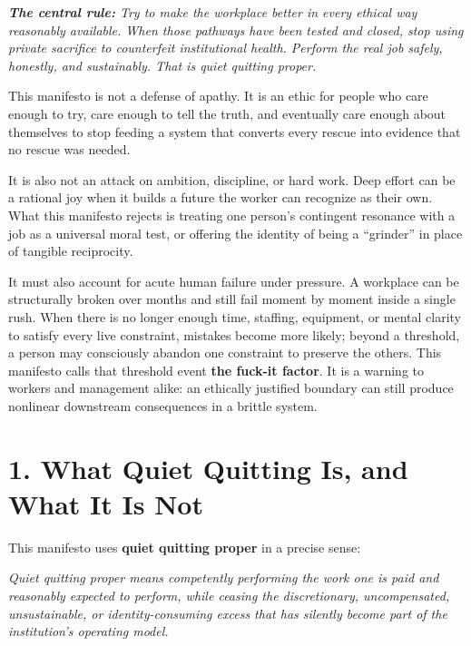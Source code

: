 \documentclass[11pt,oneside]{article}
\renewenvironment{quote}
  {\begin{tcolorbox}[
      enhanced,
      breakable,
      colback=ManifestLight,
      colframe=ManifestRule,
      boxrule=0pt,
      leftrule=3pt,
      arc=0pt,
      outer arc=0pt,
      left=10pt,right=10pt,top=8pt,bottom=8pt,
      before skip=0.8em,after skip=0.8em
    ]\itshape}
  {\end{tcolorbox}}
\begin{document}
\begin{quote}
\textbf{The central rule:} Try to make the workplace better in every
ethical way reasonably available. When those pathways have been tested
and closed, stop using private sacrifice to counterfeit institutional
health. Perform the real job safely, honestly, and sustainably. That is
quiet quitting proper.
\end{quote}

This manifesto is not a defense of apathy. It is an ethic for people who
care enough to try, care enough to tell the truth, and eventually care
enough about themselves to stop feeding a system that converts every
rescue into evidence that no rescue was needed.

It is also not an attack on ambition, discipline, or hard work. Deep
effort can be a rational joy when it builds a future the worker can
recognize as their own. What this manifesto rejects is treating one
person's contingent resonance with a job as a universal moral test, or
offering the identity of being a ``grinder'' in place of tangible
reciprocity.

It must also account for acute human failure under pressure. A workplace
can be structurally broken over months and still fail moment by moment
inside a single rush. When there is no longer enough time, staffing,
equipment, or mental clarity to satisfy every live constraint, mistakes
become more likely; beyond a threshold, a person may consciously abandon
one constraint to preserve the others. This manifesto calls that
threshold event \textbf{the fuck-it factor}. It is a warning to workers
and management alike: an ethically justified boundary can still produce
nonlinear downstream consequences in a brittle system.

\section{1. What Quiet Quitting Is, and What It Is
Not}\label{what-quiet-quitting-is-and-what-it-is-not}

This manifesto uses \textbf{quiet quitting proper} in a precise sense:

\begin{quote}
Quiet quitting proper means competently performing the work one is paid
and reasonably expected to perform, while ceasing the discretionary,
uncompensated, unsustainable, or identity-consuming excess that has
silently become part of the institution's operating model.
\end{quote}
\end{document}
